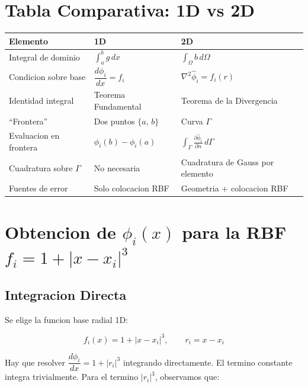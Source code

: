 \documentclass[12pt,a4paper]{article}
\begin{document}
\section{Tabla Comparativa: 1D vs 2D}

\begin{center}
\begin{tabular}{lll}
\toprule
Elemento & 1D & 2D \\
\midrule
Integral de dominio
    & $\displaystyle\int_a^b g\,dx$
    & $\displaystyle\int_\Omega b\,d\Omega$ \\[1em]
Condicion sobre base
    & $\dfrac{d\phi_i}{dx} = f_i$
    & $\nabla^2\hat\phi_i = f_i(r)$ \\[1em]
Identidad integral
    & Teorema Fundamental
    & Teorema de la Divergencia \\[0.5em]
``Frontera''
    & Dos puntos $\{a,\,b\}$
    & Curva $\Gamma$ \\[0.5em]
Evaluacion en frontera
    & $\phi_i(b) - \phi_i(a)$
    & $\displaystyle\int_\Gamma \frac{\partial\hat\phi_i}{\partial n}\,d\Gamma$ \\[1em]
Cuadratura sobre $\Gamma$
    & No necesaria
    & Cuadratura de Gauss por elemento \\[0.5em]
Fuentes de error
    & Solo colocacion RBF
    & Geometria + colocacion RBF \\
\bottomrule
\end{tabular}
\end{center}

\section{Obtencion de $\phi_i(x)$ para la RBF $f_i = 1 + |x - x_i|^3$}

\subsection{Integracion Directa}

Se elige la funcion base radial 1D:

\begin{equation}
    f_i(x) = 1 + |x - x_i|^3, \qquad r_i = x - x_i
\end{equation}

Hay que resolver $\dfrac{d\phi_i}{dx} = 1 + |r_i|^3$ integrando directamente.
El termino constante integra trivialmente. Para el termino $|r_i|^3$,
observamos que:
\end{document}
